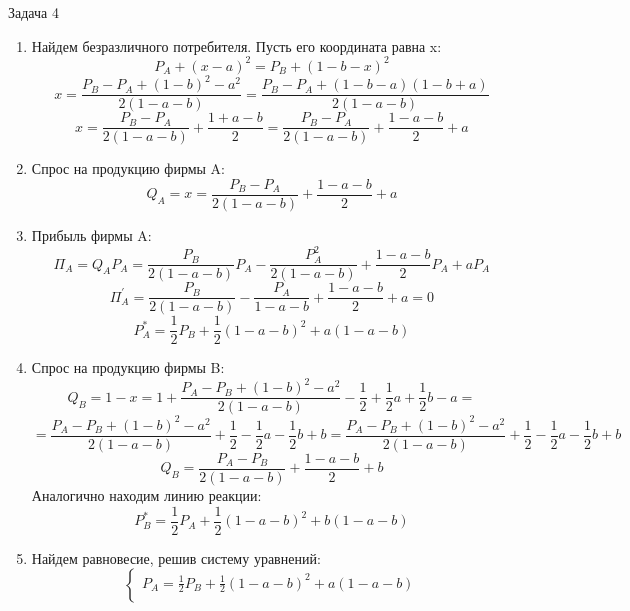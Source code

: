 \begin{mybox}{Задача 4}
\begin{enumerate}
\begin{center}
    \end{center}
    \item Найдем безразличного потребителя. Пусть его координата равна x:
    $$P_A+(x-a)^2=P_B+(1-b-x)^2$$ $$x=\frac{P_B-P_A+(1-b)^2-a^2}{2(1-a-b)}=\frac{P_B-P_A+(1-b-a)(1-b+a)}{2(1-a-b
        )}$$ $$x=\frac{P_B-P_A}{2(1-a-b)}+\frac{1+a-b}{2}=\frac{P_B-P_A}{2(1-a-b)}+\frac{1-a-b}{2}+a$$
    \item Спрос на продукцию фирмы A: $$Q_A=x=\frac{P_B-P_A}{2(1-a-b)}+\frac{1-a-b}{2}+a$$
    \item Прибыль фирмы A: $$\Pi_A=Q_AP_A=\frac{P_B}{2(1-a-b)}P_A-\frac{P_A^2}{2(1-a-b)}+\frac{1-a-b}{2}P_A+aP_A$$
    $$\Pi_A^{'}=\frac{P_B}{2(1-a-b)}-\frac{P_A}{1-a-b}+\frac{1-a-b}{2}+a=0$$ $$P_A^*=\frac{1}{2}P_B+\frac{1}{2}(1-a-b)
    ^2+a(1-a-b)$$
    \item Спрос на продукцию фирмы B: $$Q_B=1-x=1+\frac{P_A-P_B+(1-b)^2-a^2}{2(1-a-b)}-\frac{1}{2}+\frac{1}{2}a+\frac{1}{2}b-a=$$
    $$=\frac{P_A-P_B+(1-b)^2-a^2}{2(1-a-b)}+\frac{1}{2}-\frac{1}{2}a-\frac{1}{2}b+b=\frac{P_A-P_B+(1-b)^2-a^2}{2(1-a-b)}+\frac{1}{2}-\frac{1}{2}a-\frac{1}{2}b+b$$
    $$Q_B=\frac{P_A-P_B}{2(1-a-b)}+\frac{1-a-b}{2}+b$$
    Аналогично находим линию реакции: $$P_B^*=\frac{1}{2}P_A+\frac{1}{2}(1-a-b)
    ^2+b(1-a-b)$$
    \item Найдем равновесие, решив систему уравнений: $$\begin{cases}
            P_A=\frac{1}{2}P_B+\frac{1}{2}(1-a-b)^2+a(1-a-b) \\

\end{cases}$$
\end{enumerate}
\end{mybox}
